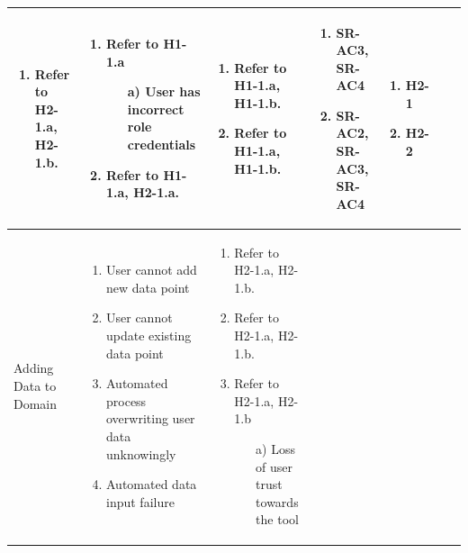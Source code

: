 \documentclass{article}
\begin{document}
\begin{landscape}
\begin{longtable}{|p{3cm}|p{3cm}|p{4cm}|p{4cm}|p{3cm}|p{2cm}|p{3cm}|}
\begin{enumerate}[leftmargin=*]
\begin{enumerate}
    \end{enumerate}
    \item Refer to H2-1.a, H2-1.b.
  \end{enumerate} &
  \begin{enumerate}[leftmargin=*]
    \item  Refer to H1-1.a
    \begin{enumerate}
        \item[a)] User has incorrect role credentials
    \end{enumerate}
    \item Refer to H1-1.a, H2-1.a.
  \end{enumerate} &
  \begin{enumerate}[leftmargin=*]
       \item Refer to H1-1.a, H1-1.b.
       \item  Refer to H1-1.a, H1-1.b.
  \end{enumerate} &
  \begin{enumerate}[leftmargin=*]
       \item SR-AC3, SR-AC4
       \item SR-AC2, SR-AC3, SR-AC4
  \end{enumerate} &
  \begin{enumerate}[leftmargin=*]
       \item H2-1
       \item H2-2
  \end{enumerate} \\
  \hline
  Adding Data to Domain & 
  \begin{enumerate}[leftmargin=*]
      \item User cannot add new data point
      \item User cannot update existing data point
      \item Automated process overwriting user data unknowingly
      \item Automated data input failure
  \end{enumerate} & 
  \begin{enumerate}[leftmargin=*]
      \item Refer to H2-1.a, H2-1.b.
      \item Refer to H2-1.a, H2-1.b.
      \item Refer to H2-1.a, H2-1.b 
      \begin{enumerate}
        \item[a)] Loss of user trust towards the tool
    \end{enumerate}

\end{enumerate}
\end{longtable}
\end{landscape}
\end{document}
